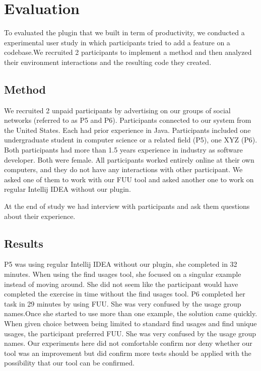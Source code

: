 \documentclass[conference]{IEEEtran}
\begin{document}
\section{Evaluation}
To evaluated the plugin that we built in term of productivity, we conducted a experimental user study in which participants tried to add a feature on a codebase.We recruited 2 participants to implement a method and then analyzed their environment interactions and the resulting code they created. 
\subsection{Method}
We recruited 2 unpaid participants by advertising on our groups of social networks (referred to as P5 and P6). Participants connected to our system from the United States. Each had prior experience in Java. Participants included one undergraduate student in computer science or a related field (P5),  one  XYZ  (P6). Both participants had more than 1.5 years experience in industry as software developer. Both were female. All participants worked entirely online at their own computers, and they do not have any interactions with other participant. We asked one of them to work with our FUU tool and asked another one to work on regular Intellij IDEA without our plugin. 

At the end of study we had interview with participants and ask them questions about their experience.
\subsection{Results}
P5 was using regular Intellij IDEA without our plugin, she completed in 32 minutes. When using the find usages tool, she focused on a singular example instead of moving around. She did not seem like the participant would have completed the exercise in time without the find usages tool.
P6 completed her task in 29 minutes by using FUU. She was very confused by the usage group names.Once she started to use more than one example, the solution came quickly. When given choice between being limited to standard find usages and find unique usages, the participant preferred FUU. She was very confused by the usage group names.
Our experiments here did not comfortable confirm nor deny whether our tool was an improvement but did confirm more tests should be applied with the possibility that our tool can be confirmed.
\end{document}
